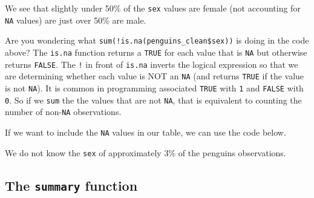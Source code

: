 \documentclass[
]{book}
\newenvironment{Shaded}{\begin{snugshade}}{\end{snugshade}}
\newcommand{\AttributeTok}[1]{\textcolor[rgb]{0.77,0.63,0.00}{#1}}
\newcommand{\CommentTok}[1]{\textcolor[rgb]{0.56,0.35,0.01}{\textit{#1}}}
\newcommand{\DocumentationTok}[1]{\textcolor[rgb]{0.56,0.35,0.01}{\textbf{\textit{#1}}}}
\newcommand{\FunctionTok}[1]{\textcolor[rgb]{0.00,0.00,0.00}{#1}}
\newcommand{\NormalTok}[1]{#1}
\newcommand{\SpecialCharTok}[1]{\textcolor[rgb]{0.00,0.00,0.00}{#1}}
\newcommand{\StringTok}[1]{\textcolor[rgb]{0.31,0.60,0.02}{#1}}
\theoremstyle{definition}
\theoremstyle{definition}
\theoremstyle{definition}
\theoremstyle{definition}
\theoremstyle{remark}
\begin{document}
\begin{Shaded}
\end{Shaded}

We see that slightly under 50\% of the \texttt{sex} values are female (not accounting for \texttt{NA} values) are just over 50\% are male.

Are you wondering what \texttt{sum(!is.na(penguins\_clean\$sex))} is doing in the code above? The \texttt{is.na} function returns a \texttt{TRUE} for each value that is \texttt{NA} but otherwise returns \texttt{FALSE}. The \texttt{!} in front of \texttt{is.na} inverts the logical expression so that we are determining whether each value is NOT an \texttt{NA} (and returns \texttt{TRUE} if the value is not \texttt{NA}). It is common in programming associated \texttt{TRUE} with \texttt{1} and \texttt{FALSE} with \texttt{0}. So if we \texttt{sum} the the values that are not \texttt{NA}, that is equivalent to counting the number of non-\texttt{NA} observations.

If we want to include the \texttt{NA} values in our table, we can use the code below.

\begin{Shaded}
\end{Shaded}

We do not know the \texttt{sex} of approximately 3\% of the penguins observations.

\hypertarget{the-summary-function}{%
\subsection{\texorpdfstring{The \texttt{summary} function}{The summary function}}\label{the-summary-function}}
\end{document}
